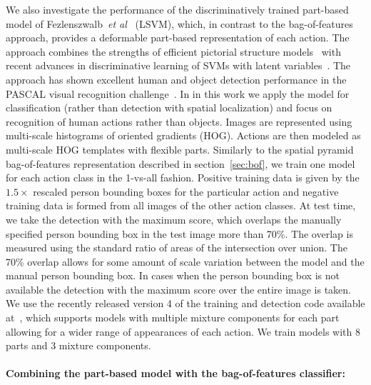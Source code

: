 \documentclass{bmvc2k}
\def\etal{\emph{et al}\bmvaOneDot}
\newcommand{\parnspc}{\vspace*{-4.2mm}}
\begin{document}
We also investigate the performance of the discriminatively trained part-based model
of Fezlenszwalb~\etal~\cite{Felzenszwalb09} (LSVM), which, in contrast to the bag-of-features approach,
provides a deformable part-based representation of each action. The approach combines
the strengths of efficient pictorial structure models~\cite{Felzenszwalb05,Fischler73} with
recent advances in discriminative learning of  SVMs with latent variables~\cite{Felzenszwalb09,Yu09a}. 
The approach has shown excellent human and object detection performance in the PASCAL visual recognition challenge~\cite{Felzenszwalb09}. In in this work we apply the model for classification (rather than detection with spatial localization) and focus on recognition of human actions rather than objects.  Images are represented using multi-scale histograms of oriented gradients (HOG). Actions are then modeled as multi-scale HOG templates with flexible parts. Similarly to the spatial pyramid bag-of-features representation described in section~\ref{sec:bof}, we train one model for each action class in the 1-vs-all fashion. Positive training
data is given by the $1.5\times$ rescaled person bounding boxes for the particular action and 
negative training data is formed from all images of the other action classes.
At test time, we take the detection with the maximum
score, which overlaps the manually specified person bounding box in the test image more than 70\%.
The overlap is measured using the standard ratio of areas of the intersection over union.
The 70\% overlap allows for some amount of scale variation between the model and
the manual person bounding box. In cases when the person bounding box is not available
the detection with the maximum score over the entire image is taken.
We use the recently released version 4 of the training and detection code available at~\cite{pedro_code}, 
which supports models with multiple mixture components for each part allowing for
a wider range of appearances  of each action. 
We train models with 8 parts and 3 mixture components.  %



\parnspc
\paragraph{Combining the part-based model with the bag-of-features classifier:}
\end{document}
